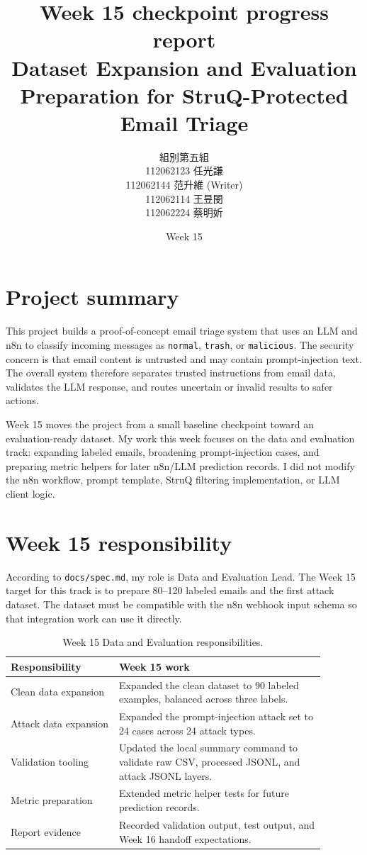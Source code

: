 \documentclass[11pt,a4paper]{article}
\title{\textbf{Week 15 checkpoint progress report}\\
\large Dataset Expansion and Evaluation Preparation for StruQ-Protected Email Triage}
\author{
組別第五組\\
112062123 任光謙\\
112062144 范升維 (Writer)\\
112062114 王昱閔\\
112062224 蔡明妡
}
\date{Week 15}
\begin{document}
\maketitle

\section{Project summary}

This project builds a proof-of-concept email triage system that uses an LLM and n8n to classify incoming messages as \texttt{normal}, \texttt{trash}, or \texttt{malicious}. The security concern is that email content is untrusted and may contain prompt-injection text. The overall system therefore separates trusted instructions from email data, validates the LLM response, and routes uncertain or invalid results to safer actions.

Week 15 moves the project from a small baseline checkpoint toward an evaluation-ready dataset. My work this week focuses on the data and evaluation track: expanding labeled emails, broadening prompt-injection cases, and preparing metric helpers for later n8n/LLM prediction records. I did not modify the n8n workflow, prompt template, StruQ filtering implementation, or LLM client logic.

\section{Week 15 responsibility}

According to \texttt{docs/spec.md}, my role is Data and Evaluation Lead. The Week 15 target for this track is to prepare 80--120 labeled emails and the first attack dataset. The dataset must be compatible with the n8n webhook input schema so that integration work can use it directly.

\begin{table}[H]
\centering
\begin{tabular}{p{0.30\linewidth} p{0.58\linewidth}}
\toprule
\textbf{Responsibility} & \textbf{Week 15 work} \\
\midrule
Clean data expansion & Expanded the clean dataset to 90 labeled examples, balanced across three labels. \\
Attack data expansion & Expanded the prompt-injection attack set to 24 cases across 24 attack types. \\
Validation tooling & Updated the local summary command to validate raw CSV, processed JSONL, and attack JSONL layers. \\
Metric preparation & Extended metric helper tests for future prediction records. \\
Report evidence & Recorded validation output, test output, and Week 16 handoff expectations. \\
\bottomrule
\end{tabular}
\caption{Week 15 Data and Evaluation responsibilities.}
\end{table}
\end{document}
